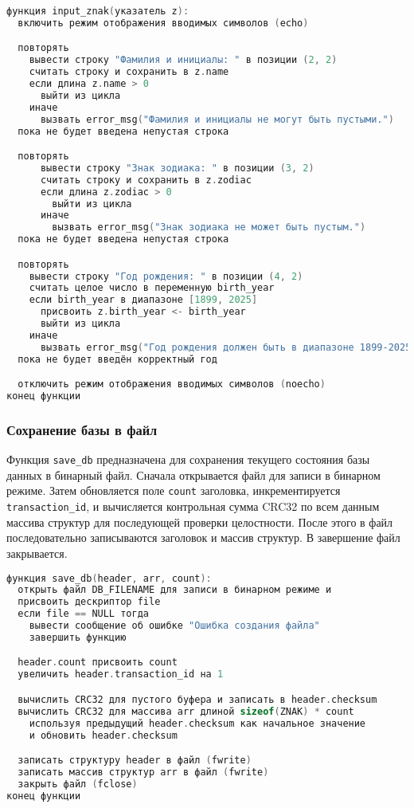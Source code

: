 \begin{lstlisting}[language=C, caption=Функция input\_znak]
функция input_znak(указатель z):
  включить режим отображения вводимых символов (echo)

  повторять
    вывести строку "Фамилия и инициалы: " в позиции (2, 2)
    считать строку и сохранить в z.name
    если длина z.name > 0
      выйти из цикла
    иначе
      вызвать error_msg("Фамилия и инициалы не могут быть пустыми.")
  пока не будет введена непустая строка

  повторять
      вывести строку "Знак зодиака: " в позиции (3, 2)
      считать строку и сохранить в z.zodiac
      если длина z.zodiac > 0
        выйти из цикла
      иначе
        вызвать error_msg("Знак зодиака не может быть пустым.")
  пока не будет введена непустая строка

  повторять
    вывести строку "Год рождения: " в позиции (4, 2)
    считать целое число в переменную birth_year
    если birth_year в диапазоне [1899, 2025]
      присвоить z.birth_year <- birth_year
      выйти из цикла
    иначе
      вызвать error_msg("Год рождения должен быть в диапазоне 1899-2025.")
  пока не будет введён корректный год

  отключить режим отображения вводимых символов (noecho)
конец функции

\end{lstlisting}

\subsubsection*{Сохранение базы в файл}

Функция \texttt{save\_db} предназначена для сохранения текущего состояния базы данных в бинарный файл. Сначала открывается файл для записи в бинарном режиме. Затем обновляется поле \texttt{count} заголовка, инкрементируется \texttt{transaction\_id}, и вычисляется контрольная сумма CRC32 по всем данным массива структур для последующей проверки целостности. После этого в файл последовательно записываются заголовок и массив структур. В завершение файл закрывается.

\begin{lstlisting}[language=C, caption=Функция save\_db]
функция save_db(header, arr, count):
  открыть файл DB_FILENAME для записи в бинарном режиме и 
  присвоить дескриптор file
  если file == NULL тогда
    вывести сообщение об ошибке "Ошибка создания файла"
    завершить функцию

  header.count присвоить count
  увеличить header.transaction_id на 1

  вычислить CRC32 для пустого буфера и записать в header.checksum
  вычислить CRC32 для массива arr длиной sizeof(ZNAK) * count
    используя предыдущий header.checksum как начальное значение
    и обновить header.checksum

  записать структуру header в файл (fwrite)
  записать массив структур arr в файл (fwrite)
  закрыть файл (fclose)
конец функции

\end{lstlisting}

